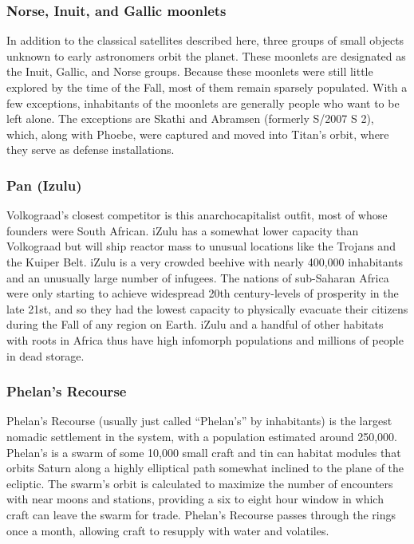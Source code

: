 \subsubsection{Norse, Inuit, and Gallic moonlets}
\label{sec:norse-inuit-gallic}

In addition to the classical satellites described here, three groups
of small objects unknown to early astronomers orbit the planet. These
moonlets are designated as the Inuit, Gallic, and Norse groups.
Because these moonlets were still little explored by the time of the
Fall, most of them remain sparsely populated. With a few exceptions,
inhabitants of the moonlets are generally people who want to be left
alone. The exceptions are Skathi and Abramsen (formerly S/2007 S 2),
which, along with Phoebe, were captured and moved into Titan's orbit,
where they serve as defense installations.

\subsubsection{Pan (Izulu)}
\label{sec:pan-izulu}

Volkograad's closest competitor is this anarchocapitalist outfit, most
of whose founders were South African. iZulu has a somewhat lower
capacity than Volkograad but will ship reactor mass to unusual
locations like the Trojans and the Kuiper Belt. iZulu is a very
crowded beehive with nearly 400,000 inhabitants and an unusually large
number of infugees. The nations of sub-Saharan Africa were only
starting to achieve widespread 20th century-levels of prosperity in
the late 21st, and so they had the lowest capacity to physically
evacuate their citizens during the Fall of any region on Earth. iZulu
and a handful of other habitats with roots in Africa thus have high
infomorph populations and millions of people in dead storage.

\subsubsection{Phelan's Recourse}
\label{sec:phelans-recourse}

Phelan's Recourse (usually just called “Phelan's” by inhabitants) is
the largest nomadic settlement in the system, with a population
estimated around 250,000.  Phelan's is a swarm of some 10,000 small
craft and tin can habitat modules that orbits Saturn along a highly
elliptical path somewhat inclined to the plane of the ecliptic. The
swarm's orbit is calculated to maximize the number of encounters with
near moons and stations, providing a six to eight hour window in which
craft can leave the swarm for trade. Phelan's Recourse passes through
the rings once a month, allowing craft to resupply with water and
volatiles.

